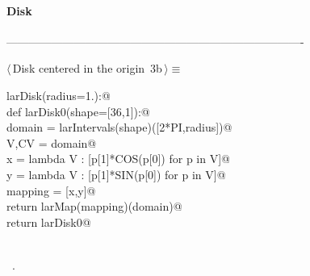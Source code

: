 \documentclass[11pt,oneside]{article}	%
\begin{document}
\paragraph{Disk}
-------------------------------------------------------------------------------
\begin{flushleft} \small \label{scrap6}
\protect{}$\langle\,$Disk centered in the origin\nobreak\ {\footnotesize 3b}$\,\rangle\equiv$
\vspace{-1ex}
\begin{list}{}{} \item
\mbox{}\verb@def larDisk(radius=1.):@\\
\mbox{}\verb@   def larDisk0(shape=[36,1]):@\\
\mbox{}\verb@      domain = larIntervals(shape)([2*PI,radius])@\\
\mbox{}\verb@      V,CV = domain@\\
\mbox{}\verb@      x = lambda V : [p[1]*COS(p[0]) for p in V]@\\
\mbox{}\verb@      y = lambda V : [p[1]*SIN(p[0]) for p in V]@\\
\mbox{}\verb@      mapping = [x,y]@\\
\mbox{}\verb@      return larMap(mapping)(domain)@\\
\mbox{}\verb@   return larDisk0@\\
\mbox{}\verb@@\\
\mbox{}\verb@@{\NWsep}
\end{list}
\vspace{-1ex}
\footnotesize\addtolength{\baselineskip}{-1ex}
\begin{list}{}{\setlength{\itemsep}{-\parsep}\setlength{\itemindent}{-\leftmargin}}
\item \NWtxtMacroRefIn\ .
\end{list}
\end{flushleft}
\end{document}
